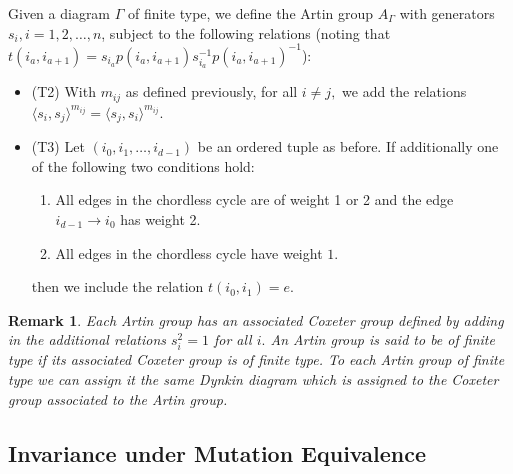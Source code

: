 \documentclass{beamer}
\newtheorem{rem}{Remark}
\begin{document}
\begin{frame}
Given a diagram $\Gamma$ of finite type, we define the Artin group $A_{\Gamma}$ with generators $s_i, i = 1,2,\ldots, n$, subject to the following relations (noting that $t(i_a,i_{a+1}) = s_{i_a} p(i_a,i_{a+1})  s_{i_a}^{-1}p(i_a,i_{a+1})^{-1}$):

\begin{block}

\begin{itemize}

\item{\alert{(T2)}} With $m_{ij}$ as defined previously, for all $i \neq j,$ we add the relations
$\langle s_i,s_j \rangle^{m_{ij}}= \langle s_j,s_i \rangle^{m_{ij}}.$

\item{\alert{(T3)}} Let $(i_0,i_1,\ldots,i_{d-1})$ be an ordered tuple as before. If additionally one of the following two conditions hold:
\begin{enumerate}
\item All edges in the chordless cycle are of weight 1 or 2 and the edge $i_{d-1}\rightarrow i_0$ has weight 2.
\item All edges in the chordless cycle have weight $1.$
\end{enumerate}
then we include the relation
$t(i_0,i_1) = e.$



\end{itemize}

\end{block}



\end{frame}

\begin{frame}
\begin{rem}
Each Artin group has an associated Coxeter group defined by adding in the additional relations $s_i^2 = 1$ for all $i.$ An Artin group is said to be of {\it finite type} if its associated Coxeter group is of finite type. To each Artin group of finite type we can assign it the same Dynkin diagram which is assigned to the Coxeter group associated to the Artin group.
\end{rem}
\end{frame}

\subsection{Invariance under Mutation Equivalence}
\end{document}
